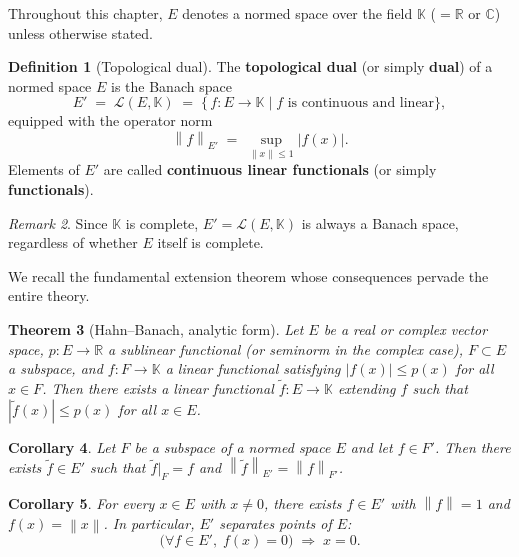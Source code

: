\documentclass[a4paper,12pt]{book}
\newcommand{\R}{\mathbb{R}}
\newcommand{\C}{\mathbb{C}}
\newcommand{\K}{\mathbb{K}}
\newcommand{\norm}[1]{\left\| #1 \right\|}
\newcommand{\abs}[1]{\left| #1 \right|}
\theoremstyle{definition}
\newtheorem{definition}{Definition}[chapter]
\theoremstyle{plain}
\newtheorem{theorem}[definition]{Theorem}
\newtheorem{corollary}[definition]{Corollary}
\theoremstyle{remark}
\newtheorem{remark}[definition]{Remark}
\begin{document}
Throughout this chapter, $E$ denotes a normed space over the field
$\K$ ($= \R$ or $\C$) unless otherwise stated.

\begin{definition}[Topological dual]\label{def:topological-dual}
The \textbf{topological dual} (or
simply \textbf{dual}) of a normed space $E$ is the Banach space
\[
  E' \;=\; \mathcal{L}(E,\K)
  \;=\; \bigl\{\, f: E \to \K \;\big|\; f \text{ is continuous and linear}\bigr\},
\]
equipped with the operator norm
\[
  \norm{f}_{E'} \;=\; \sup_{\norm{x}\le 1} \abs{f(x)}.
\]
Elements of $E'$ are called \textbf{continuous linear functionals}
(or simply \textbf{functionals}).
\end{definition}

\begin{remark}\label{rem:dual-banach}
Since $\K$ is complete, $E' = \mathcal{L}(E,\K)$ is always a Banach space,
regardless of whether $E$ itself is complete.
\end{remark}

We recall the fundamental extension theorem whose consequences pervade the
entire theory.

\begin{theorem}[{Hahn--Banach, analytic form}]\label{thm:hahn-banach-recall}
Let $E$ be a real or complex vector space, $p:E\to\R$ a sublinear functional
(or seminorm in the complex case), $F\subset E$ a subspace, and $f:F\to\K$
a linear functional satisfying $\abs{f(x)}\le p(x)$ for all $x\in F$.  Then
there exists a linear functional $\tilde{f}:E\to\K$ extending $f$ such that
$\abs{\tilde{f}(x)}\le p(x)$ for all $x\in E$.
\end{theorem}

\begin{corollary}\label{cor:hb-norm-preserving}
Let $F$ be a subspace of a normed space $E$ and let $f\in F'$.  Then there
exists $\tilde{f}\in E'$ such that $\tilde{f}\big|_F = f$ and
$\norm{\tilde{f}}_{E'} = \norm{f}_{F'}$.
\end{corollary}

\begin{corollary}\label{cor:hb-separation}
For every $x\in E$ with $x\ne 0$, there exists $f\in E'$ with $\norm{f}=1$
and $f(x) = \norm{x}$.  In particular, $E'$ separates points of $E$:
\[
  \bigl(\forall f\in E',\; f(x)=0\bigr) \;\Longrightarrow\; x=0.
\]
\end{corollary}
\end{document}
